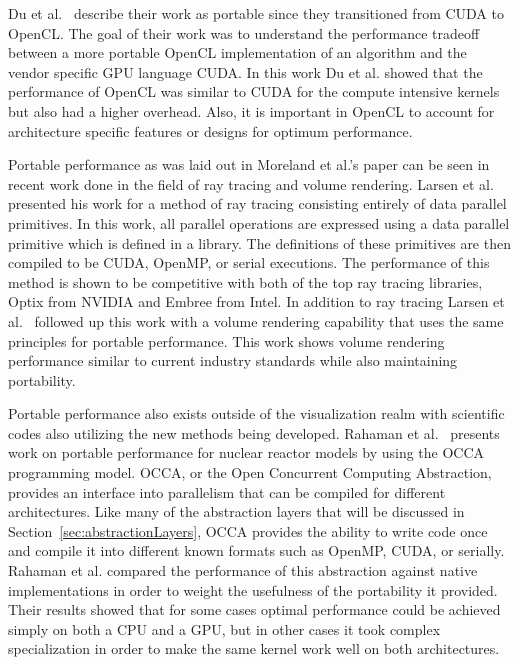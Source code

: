 Du et al.~\cite{du2012cuda} describe their work as portable since they transitioned from CUDA to OpenCL.
%
The goal of their work was to understand the performance tradeoff between a more portable OpenCL implementation of an algorithm and the vendor specific GPU language CUDA.
%
In this work Du et al. showed that the performance of OpenCL was similar to CUDA for the compute intensive kernels but also had a higher overhead.
%
Also, it is important in OpenCL to account for architecture specific features or designs for optimum performance.
%

Portable performance as was laid out in Moreland et al.'s paper can be seen in recent work done in the field of ray tracing and volume rendering.
%
Larsen et al.~\cite{larsen2015ray} presented his work for a method of ray tracing consisting entirely of data parallel primitives.
%
In this work, all parallel operations are expressed using a data parallel primitive which is defined in a library.
%
The definitions of these primitives are then compiled to be CUDA, OpenMP, or serial executions.
%
The performance of this method is shown to be competitive with both of the top ray tracing libraries, Optix from NVIDIA and Embree from Intel. 
%
In addition to ray tracing Larsen et al.~\cite{larsen2015volume} followed up this work with a volume rendering capability that uses the same principles for portable performance.
%
This work shows volume rendering performance similar to current industry standards while also maintaining portability.

Portable performance also exists outside of the visualization realm with scientific codes also utilizing the new methods being developed.
%
Rahaman et al.~\cite{rahaman2015portability} presents work on portable performance for nuclear reactor models by using the OCCA programming model.
%
OCCA, or the Open Concurrent Computing Abstraction, provides an interface into parallelism that can be compiled for different architectures.
%
Like many of the abstraction layers that will be discussed in Section~\ref{sec:abstractionLayers}, OCCA provides the ability to write code once and compile it into different known formats such as OpenMP, CUDA, or serially.
%
Rahaman et al. compared the performance of this abstraction against native implementations in order to weight the usefulness of the portability it provided.
%
Their results showed that for some cases optimal performance could be achieved simply on both a CPU and a GPU, but in other cases it took complex specialization in order to make the same kernel work well on both architectures.


